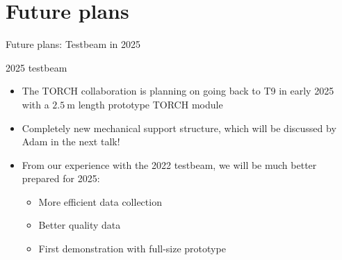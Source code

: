 \documentclass[xcolor={dvipsnames}]{beamer}
\begin{document}
\section{Future plans}

\begin{frame}{Future plans: Testbeam in 2025}
  \begin{center}
    {\Large 2025 testbeam}
  \end{center}
  \begin{itemize}
    \setlength\itemsep{1.0em}
    \item{The TORCH collaboration is planning on going back to T9 in early 2025 with a $\SI{2.5}{\meter}$ length prototype TORCH module}
    \item{Completely new mechanical support structure, which will be discussed by Adam in the next talk!}
    \item{From our experience with the 2022 testbeam, we will be much better prepared for 2025:}
    \begin{itemize}
      \item{More efficient data collection}
      \item{Better quality data}
      \item{First demonstration with full-size prototype}
    \end{itemize}
  \end{itemize}
\end{frame}
\end{document}
